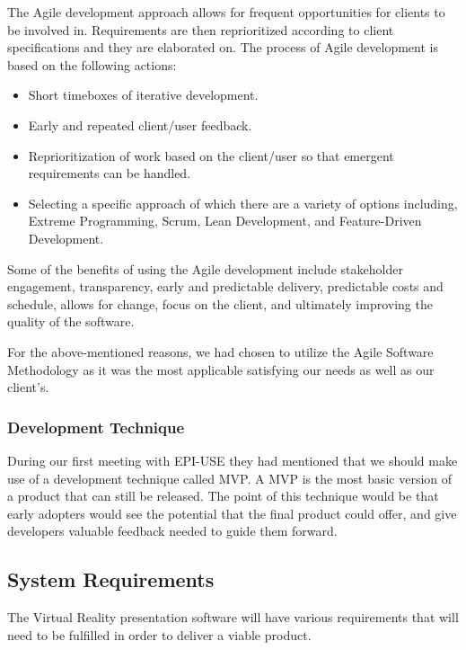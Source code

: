 \begin{flushleft}

The Agile development approach allows for frequent opportunities for clients to be involved in. Requirements are then reprioritized according to client specifications and they are elaborated on. The process of Agile development is based on the following actions:

    \begin{itemize}
			\item Short timeboxes of iterative development.
			\item Early and repeated client/user feedback.
			\item Reprioritization of work based on the client/user so that emergent requirements can be handled.
			\item Selecting a specific approach of which there are a variety of options including, Extreme Programming, Scrum, Lean Development, and Feature-Driven Development.
		\end{itemize}

Some of the benefits of using the Agile development include stakeholder engagement, transparency, early and predictable delivery, predictable costs and schedule, allows for change, focus on the client, and ultimately improving the quality of the software.

For the above-mentioned reasons, we had chosen to utilize the Agile Software Methodology as it was the most applicable satisfying our needs as well as our client's.

	\subsubsection{Development Technique}
	During our first meeting with EPI-USE they had mentioned that we should make use of a development technique called MVP. A MVP is the most basic version of a product that can still be released. The point of this technique would be that early adopters would see the potential that the final product could offer, and give developers valuable feedback needed to guide them forward.

\subsection{System Requirements}

The Virtual Reality presentation software will have various requirements that will need to be fulfilled in order to deliver a viable product.


\end{flushleft}
